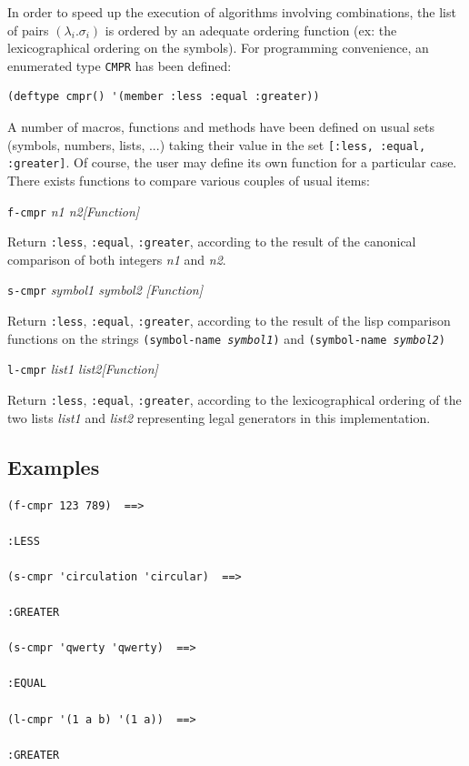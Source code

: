 In order to speed up the execution of algorithms involving combinations,
the list of pairs $(\lambda_i.\sigma_i)$ is ordered by an adequate ordering function (ex: the  lexicographical ordering
on the symbols). For programming convenience, an enumerated type {\tt CMPR} has been defined:
{\footnotesize\begin{verbatim}
(deftype cmpr() '(member :less :equal :greater))
\end{verbatim}}
A number of macros, functions and methods have been defined
on usual sets (symbols, numbers, lists, ...) taking their value in the set
{\tt [:less, :equal, :greater]}. Of course, the user may define its own function for a particular case.
There exists functions to compare various couples of usual items:
\vskip 0.45cm
{\parindent=0mm
{\leftskip=5mm 
{\tt f-cmpr} {\em n1 n2}\hfill {\em [Function]} \par}
{\leftskip=12mm 
Return {\tt :less}, {\tt :equal}, {\tt :greater}, according to the result of
the canonical comparison of both integers {\em n1} and {\em n2}. \par}
{\leftskip=5mm 
{\tt s-cmpr} {\em symbol1 symbol2} \hfill {\em [Function]}\par}
{\leftskip=12mm 
Return  {\tt :less}, {\tt :equal}, {\tt :greater}, according to the result of
the lisp comparison functions on the strings {\tt (symbol-name {\em symbol1})}
and {\tt (symbol-name {\em symbol2})} \par}
{\leftskip=5mm 
{\tt l-cmpr} {\em list1 list2}\hfill {\em [Function]} \par}
{\leftskip=12mm 
Return  {\tt :less}, {\tt :equal}, {\tt :greater}, according to the 
lexicographical ordering of the two lists  {\em list1}
and {\em list2} representing legal generators in this implementation. \par}
}

\subsection* {Examples}

{\footnotesize\begin{verbatim}
(f-cmpr 123 789)  ==>

:LESS

(s-cmpr 'circulation 'circular)  ==>

:GREATER

(s-cmpr 'qwerty 'qwerty)  ==>

:EQUAL

(l-cmpr '(1 a b) '(1 a))  ==>

:GREATER
\end{verbatim}}
\newpage

